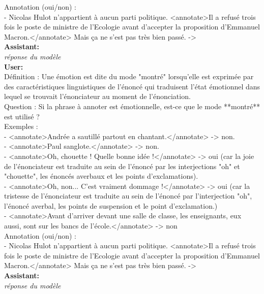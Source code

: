 {Annotation (oui/non) :\\
- Nicolas Hulot n’appartient à aucun parti politique. <annotate>Il a refusé trois fois le poste de ministre de l’Ecologie avant d’accepter la proposition d’Emmanuel Macron.</annotate> Mais ça ne s’est pas très bien passé.  -> \\

\textbf{Assistant:}\\
\textit{réponse du modèle}\\

\textbf{User:}\\
Définition : Une émotion est dite du mode "montré" lorsqu'elle est exprimée par des caractéristiques linguistiques de l'énoncé qui traduisent l'état émotionnel dans lequel se trouvait l'énonciateur au moment de l'énonciation.\\

Question : Si la phrase à annoter est émotionnelle, est-ce que le mode **montré** est utilisé ?\\

Exemples :\\
- <annotate>Andrée a sautillé partout en chantant.</annotate> -> non.\\
- <annotate>Paul sanglote.</annotate> -> non.\\
- <annotate>Oh, chouette ! Quelle bonne idée !</annotate> -> oui (car la joie de l'énonciateur est traduite au sein de l'énoncé par les interjections "oh" et "chouette", les énoncés averbaux et les points d'exclamations).\\
- <annotate>Oh, non... C'est vraiment dommage !</annotate> -> oui (car la tristesse de l'énonciateur est traduite au sein de l'énoncé par l'interjection "oh", l'énoncé averbal, les points de suspension et le point d'exclamation.)\\
- <annotate>Avant d'arriver devant une salle de classe, les enseignants, eux aussi, sont sur les bancs de l'école.</annotate> -> non\\

Annotation (oui/non) :\\
- Nicolas Hulot n’appartient à aucun parti politique. <annotate>Il a refusé trois fois le poste de ministre de l’Ecologie avant d’accepter la proposition d’Emmanuel Macron.</annotate> Mais ça ne s’est pas très bien passé.  -> \\

\textbf{Assistant:}\\
\textit{réponse du modèle}\\

}
